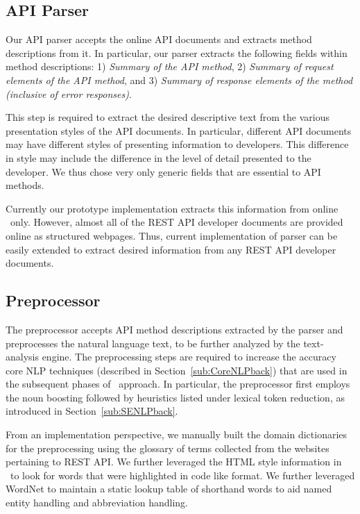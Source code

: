 \subsection{API Parser}
\label{sub:parser}

Our API parser accepts the online API documents and extracts method descriptions from it.
In particular, our parser extracts the following fields within method descriptions: 
1) \textit{Summary of the API method},
2) \textit{Summary of request elements of the API method}, and 
3) \textit{Summary of response elements of the method (inclusive of error responses)}.

This step is required to extract the desired descriptive text from the various presentation styles of the API documents.
In particular, different API documents may have different styles of presenting information to developers.
This difference in style may include the difference in the level of detail presented to the developer.
We thus chose very only generic fields that are essential to API methods. 

Currently our prototype implementation extracts this information from online \amazon\ only. 
However, almost all of the REST API developer documents are provided online as structured webpages.
Thus, current implementation of parser can be easily extended to extract desired information from any REST API developer documents.    


\subsection{Preprocessor}
\label{sub:Preprocessor}

The preprocessor accepts API method descriptions extracted by the parser and preprocesses the natural language text, to be further analyzed by the text-analysis engine.
The preprocessing steps are required to increase the accuracy core NLP techniques (described in Section~\ref{sub:CoreNLPback}) that are used in the subsequent phases of \tool\ approach.
In particular, the preprocessor first employs the noun boosting followed by heuristics listed under lexical token reduction, as introduced in Section~\ref{sub:SENLPback}.

From an implementation perspective, we manually built the domain dictionaries for the preprocessing using the glossary of terms collected from the websites pertaining to REST API.
We further leveraged the HTML style information in \amazon\ to look for words that were highlighted in code like format. We further leveraged WordNet to maintain a static lookup table of shorthand words to aid named entity handling and abbreviation handling. 

